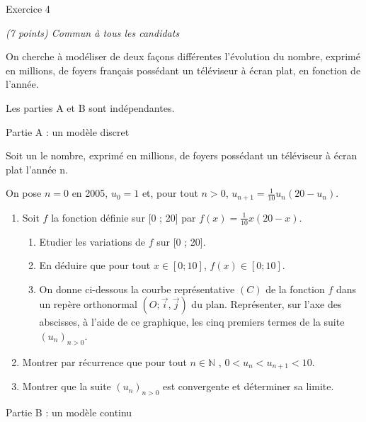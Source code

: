 
%
\begin{h2}Exercice 4\end{h2}
\textit{(7 points) Commun à tous les candidats}
\par
On cherche à modéliser de deux façons différentes l'évolution du nombre, exprimé en millions, de foyers français possédant un téléviseur à écran plat, en fonction de l'année.
\par
Les parties A et B sont indépendantes.
\begin{h3}Partie A : un modèle discret\end{h3}
Soit un le nombre, exprimé en millions, de foyers possédant un téléviseur à écran plat l'année n.
\par
On pose $ n = 0  $ en 2005, $u_{0}=1$ et, pour tout $n > 0$, $u_{n+1}=\frac{1}{10} u_{n} \left(20-u_{n}\right)$.
\begin{enumerate}
     \item
     Soit $f$ la fonction définie sur [0 ; 20] par $f\left(x\right)=\frac{1}{10} x\left(20-x\right)$.
     \begin{enumerate}[label=\alph*.]
          \item
          Etudier les variations de $f$ sur [0 ; 20].
          \item
          En déduire que pour tout $x\in \left[0; 10\right]$,  $f\left(x\right)\in \left[0; 10\right]$.
          \item
          On donne ci-dessous la courbe représentative $\left(C\right)$ de la fonction $f$ dans un repère orthonormal $\left(O; \vec{i}, \vec{j}\right)$ du plan. Représenter, sur l'axe des abscisses, à l'aide de ce graphique, les cinq premiers termes de la suite $\left(u_{n}\right)_{n > 0}$.


\begin{center}
\end{center}
     \end{enumerate}
     \item
     Montrer par récurrence que pour tout $n\in \mathbb{N}$ , $0 < u_{n} < u_{n+1} < 10$.
     \item
     Montrer que la suite $\left(u_{n}\right)_{n > 0}$ est convergente et déterminer sa limite.
\end{enumerate}
\begin{h3}Partie B : un modèle continu\end{h3}
